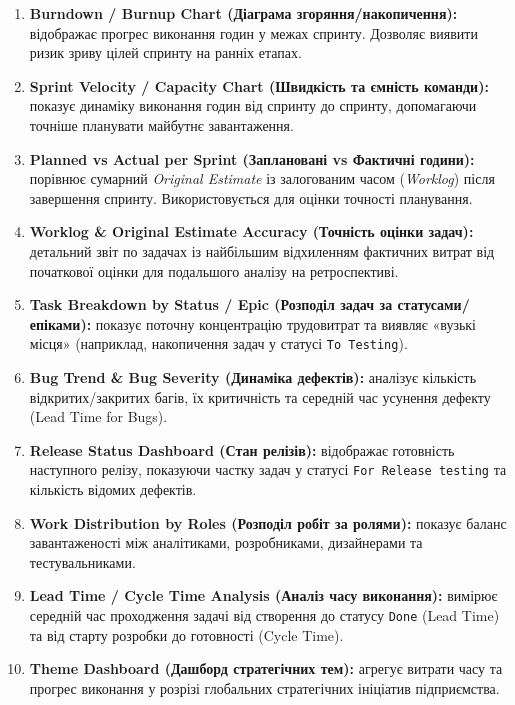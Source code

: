 \documentclass{article}
\begin{document}
\begin{enumerate}
    \item \textbf{Burndown / Burnup Chart (Діаграма згоряння/накопичення):} відображає прогрес виконання годин у межах спринту. Дозволяє виявити ризик зриву цілей спринту на ранніх етапах.
    \item \textbf{Sprint Velocity / Capacity Chart (Швидкість та ємність команди):} показує динаміку виконання годин від спринту до спринту, допомагаючи точніше планувати майбутнє завантаження.
    \item \textbf{Planned vs Actual per Sprint (Заплановані vs Фактичні години):} порівнює сумарний \emph{Original Estimate} із залогованим часом (\emph{Worklog}) після завершення спринту. Використовується для оцінки точності планування.
    \item \textbf{Worklog \& Original Estimate Accuracy (Точність оцінки задач):} детальний звіт по задачах із найбільшим відхиленням фактичних витрат від початкової оцінки для подальшого аналізу на ретроспективі.
    \item \textbf{Task Breakdown by Status / Epic (Розподіл задач за статусами/епіками):} показує поточну концентрацію трудовитрат та виявляє «вузькі місця» (наприклад, накопичення задач у статусі \texttt{To Testing}).
    \item \textbf{Bug Trend \& Bug Severity (Динаміка дефектів):} аналізує кількість відкритих/закритих багів, їх критичність та середній час усунення дефекту (Lead Time for Bugs).
    \item \textbf{Release Status Dashboard (Стан релізів):} відображає готовність наступного релізу, показуючи частку задач у статусі \texttt{For Release testing} та кількість відомих дефектів.
    \item \textbf{Work Distribution by Roles (Розподіл робіт за ролями):} показує баланс завантаженості між аналітиками, розробниками, дизайнерами та тестувальниками.
    \item \textbf{Lead Time / Cycle Time Analysis (Аналіз часу виконання):} вимірює середній час проходження задачі від створення до статусу \texttt{Done} (Lead Time) та від старту розробки до готовності (Cycle Time).
    \item \textbf{Theme Dashboard (Дашборд стратегічних тем):} агрегує витрати часу та прогрес виконання у розрізі глобальних стратегічних ініціатив підприємства.
\end{enumerate}

\newpage
\end{document}
